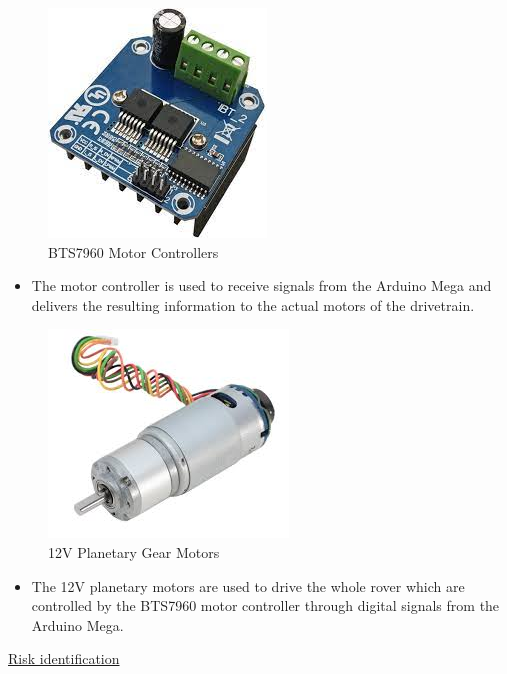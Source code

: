 \documentclass[a4paper, 10pt]{article}
\begin{document}
\begin{figure} [!h]
			\centering
			\includegraphics[scale=0.25]{Photos/BTS7960 Motor Driver}
			\caption{BTS7960 Motor Controllers}
		\end{figure}



\begin{itemize}
\item
	The motor controller is used to receive signals from the Arduino Mega and delivers the resulting information to the actual motors of the drivetrain.
\end{itemize}

\begin{figure} [!h]
			\centering
			\includegraphics[scale=0.25]{Photos/Gear motor 12V planetary}
			\caption{12V Planetary Gear Motors}
		\end{figure}


\begin{itemize}
\item
	The 12V planetary motors are used to drive the whole rover which are controlled by the BTS7960 motor controller through digital signals from the Arduino Mega.
\end{itemize}


\underline{Risk identification}
\end{document}
